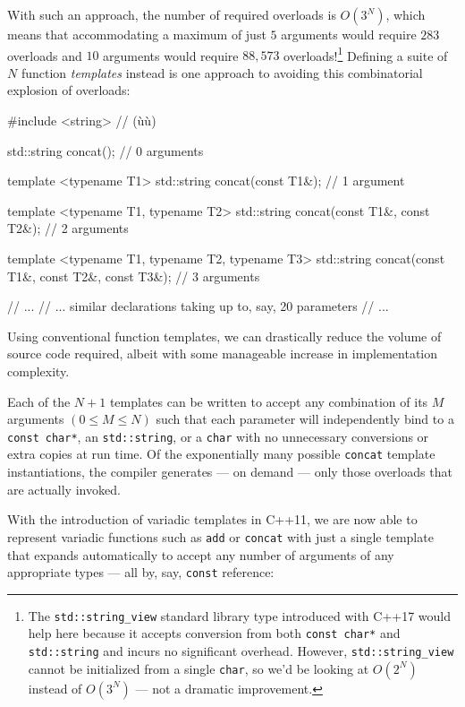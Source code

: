 With such an approach, the number of required overloads is \(O(3^{N})\),
which means that accommodating a maximum of just \(5\) arguments would
require \(283\) overloads and \(10\) arguments would require \(88,573\)
overloads!{\cprotect\footnote{The \lstinline!std::string_view! standard
library type introduced with C++17 would help here because it accepts
conversion from both \lstinline!const!~\lstinline!char*! and
\lstinline!std::string! and incurs no significant overhead. However,
\lstinline!std::string_view! cannot be initialized from a single
\lstinline!char!, so we'd be looking at $O(2^{N})$ instead of
  $O(3^{N})$ --- not a dramatic improvement.}} Defining a suite of
$N$ function \emph{templates} instead is one approach to avoiding this
combinatorial explosion of overloads:

\begin{emcppslisting}
#include <string>  // (ù{}ù)

std::string concat();                                    // 0 arguments

template <typename T1>
std::string concat(const T1&);                           // 1 argument

template <typename T1, typename T2>
std::string concat(const T1&, const T2&);                // 2 arguments

template <typename T1, typename T2, typename T3>
std::string concat(const T1&, const T2&, const T3&);     // 3 arguments

// ...
// ... similar declarations taking up to, say, 20 parameters
// ...
\end{emcppslisting}
    

\noindent Using conventional function templates, we can drastically reduce the
volume of source code required, albeit with some manageable increase in
implementation complexity.

Each of the $N + 1$ templates can be written to accept any combination
of its $M$ arguments $(0 \leq M \leq N)$ such that each parameter
will independently bind to a \lstinline!const!~\lstinline!char*!, an
\lstinline!std::string!, or a \lstinline!char! with no unnecessary conversions
or extra copies at run time. Of the exponentially many possible
\lstinline!concat! template instantiations, the compiler generates --- on
demand --- only those overloads that are actually invoked.

With the introduction of variadic templates in C++11, we are now able to
represent variadic functions such as \lstinline!add! or \lstinline!concat!
with just a single template that expands automatically to accept any
number of arguments of any appropriate types --- all by, say,
\lstinline!const!  reference:

